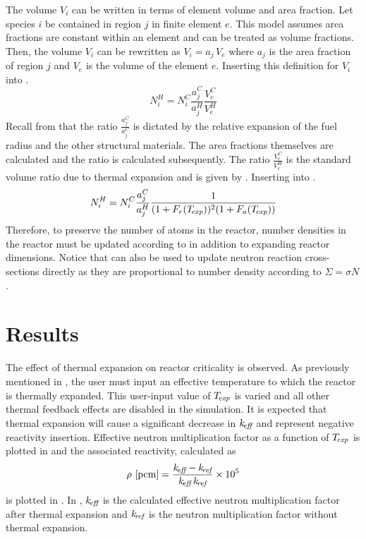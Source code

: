     The volume $V_i$ can be written in terms of element volume and area
    fraction. Let species $i$ be contained in region $j$ in finite element $e$. 
    This model assumes area fractions are constant within an element and can be
    treated as volume fractions. Then, the volume $V_i$ can be rewritten as 
    $V_i = a_j \, V_e$ where $a_j$ is the area fraction of region $j$ and $V_e$
    is the volume of the element $e$. Inserting this definition for $V_i$ into
    .
    \begin{equation}
      \label{eq:nden_expansion_expanded}
      N_i^H = N_i^C \frac{a_j^C}{a_j^H} \frac{V_e^C}{V_e^H}
    \end{equation}
    Recall from  that the
    ratio $\frac{a_j^C}{a_j^C}$ is dictated by the relative expansion of the
    fuel radius and the other structural materials. The area fractions
    themselves are calculated and the ratio is calculated subsequently. The 
    ratio $\frac{V_e^C}{V_e^H}$ is the standard volume ratio due to thermal 
    expansion and is given by . Inserting 
     into .
    \begin{equation}
      \label{eq:nden_thexp_update}
      N_i^H = N_i^C \frac{a_j^C}{a_j^H} 
        \frac{1}{(1+F_r(T_{\!\mbox{\scriptsize \em exp}}))^2 (1+F_a(T_{\!\mbox{\scriptsize \em exp}}))}
    \end{equation}
    Therefore, to preserve the number of atoms in the reactor, number densities
    in the reactor must be updated according to  in
    addition to expanding reactor dimensions. Notice that
     can also be used to update neutron reaction 
    cross-sections directly as they are proportional to number density according
    to $\Sigma = \sigma N$.

\section{Results}
  The effect of thermal expansion on reactor criticality is observed. As
  previously mentioned in , 
  the user must input an effective temperature to which the reactor is thermally 
  expanded. This user-input value of $T_{\!\mbox{\scriptsize \em exp}}$ is varied and all other thermal 
  feedback effects are disabled in the simulation. It is expected that thermal 
  expansion will cause a significant decrease in $k_{\!\mbox{\scriptsize \em eff}}$ and represent negative 
  reactivity insertion. Effective neutron multiplication factor as a function of
  $T_{\!\mbox{\scriptsize \em exp}}$ is plotted in  and the associated reactivity, 
  calculated as
  \begin{equation}
    \label{eq:reactivity_formula}
    \rho \,\left[\text{{pcm}}\right] = \frac{k_{\!\mbox{\scriptsize \em eff}} - k_{\!\mbox{\scriptsize \em ref}}}{k_{\!\mbox{\scriptsize \em eff}} \, k_{\!\mbox{\scriptsize \em ref}}} \times 10^5
  \end{equation}
  is plotted in . In
  , $k_{\!\mbox{\scriptsize \em eff}}$ is the calculated effective neutron 
  multiplication factor after thermal expansion and $k_{\!\mbox{\scriptsize \em ref}}$ is the neutron 
  multiplication factor without thermal expansion. 


